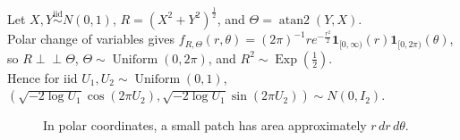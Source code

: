 \begin{example} \label{ex:polar-transform-standard-normal} \\
Let $X,Y\overset{\mathrm{iid}}{\sim}N(0,1)$, $R=(X^2+Y^2)^{\frac{1}{2}}$, and $\Theta=\operatorname{atan2}(Y,X)$.\\
Polar change of variables gives $f_{R,\Theta}(r,\theta)=(2\pi)^{-1}re^{-\frac{r^2}{2}}\mathbf{1}_{[0,\infty)}(r)\mathbf{1}_{[0,2\pi)}(\theta)$,\\
so $R\perp\!\!\!\perp\Theta$, $\Theta\sim\operatorname{Uniform}(0,2\pi)$, and $R^2\sim\operatorname{Exp}(\frac{1}{2})$.\\
Hence for iid $U_1,U_2\sim\operatorname{Uniform}(0,1)$, $(\sqrt{-2\log U_1}\cos(2\pi U_2),\sqrt{-2\log U_1}\sin(2\pi U_2))\sim N(0,I_2)$.
\end{example}

\begin{figure}[H]
  \centering
  
  \caption{In polar coordinates, a small patch has area approximately $r\,dr\,d\theta$.}
  \label{fig:polar-area-patch-rdrdtheta}
\end{figure}
